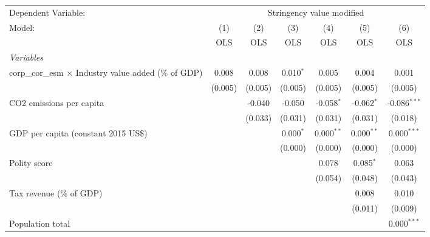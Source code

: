 
\begingroup
\centering
\begin{tabular}{lcccccc}
   \toprule
   Dependent Variable: & \multicolumn{6}{c}{Stringency value modified}\\
   Model:                                                       & (1)     & (2)     & (3)         & (4)          & (5)          & (6)\\  
                                                                &  OLS    & OLS     & OLS         & OLS          & OLS          & OLS\\  
   \midrule
   \emph{Variables}\\
   corp\_cor\_esm $\times$ Industry value added (\% of GDP)     & 0.008   & 0.008   & 0.010$^{*}$ & 0.005        & 0.004        & 0.001\\   
                                                                & (0.005) & (0.005) & (0.005)     & (0.005)      & (0.005)      & (0.005)\\   
   CO2 emissions per capita                                     &         & -0.040  & -0.050      & -0.058$^{*}$ & -0.062$^{*}$ & -0.086$^{***}$\\   
                                                                &         & (0.033) & (0.031)     & (0.031)      & (0.031)      & (0.018)\\   
   GDP per capita (constant 2015 US\$)                          &         &         & 0.000$^{*}$ & 0.000$^{**}$ & 0.000$^{**}$ & 0.000$^{***}$\\   
                                                                &         &         & (0.000)     & (0.000)      & (0.000)      & (0.000)\\   
   Polity score                                                 &         &         &             & 0.078        & 0.085$^{*}$  & 0.063\\   
                                                                &         &         &             & (0.054)      & (0.048)      & (0.043)\\   
   Tax revenue (\% of GDP)                                      &         &         &             &              & 0.008        & 0.010\\   
                                                                &         &         &             &              & (0.011)      & (0.009)\\   
   Population total                                             &         &         &             &              &              & 0.000$^{***}$\\   

\end{tabular}
